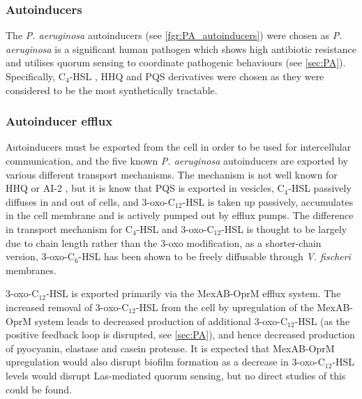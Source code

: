 

\subsubsection{Autoinducers}

The \textit{P. aeruginosa} autoinducers (see \ref{fgr:PA_autoinducers}) were chosen as \textit{P. aeruginosa} is a significant human pathogen which shows high antibiotic resistance and utilises quorum sensing to coordinate pathogenic behaviours (see \ref{sec:PA}). 
Specifically, C$_4$-HSL , HHQ  and PQS  derivatives were chosen as they were considered to be the most synthetically tractable.

\subsubsection{Autoinducer efflux\label{sec:AI_eff}}

Autoinducers must be exported from the cell in order to be used for intercellular communication, and the five known \textit{P. aeruginosa} autoinducers are exported by various different transport mechanisms.
The mechanism is not well known for HHQ  or AI-2 , but it is know that
PQS  is exported in vesicles\cite{Florez2017},
C$_4$-HSL  passively diffuses in and out of cells\cite{Pearson1999}, and
3-oxo-C$_{12}$-HSL  is taken up passively, accumulates in the cell membrane and is actively pumped out by efflux pumps.
The difference in transport mechanism for C$_4$-HSL  and 3-oxo-C$_{12}$-HSL  is thought to be largely due to chain length rather than the 3-oxo modification, as a shorter-chain version, 3-oxo-C$_6$-HSL  has been shown to be freely diffusable through \textit{V. fischeri} membranes\cite{Kaplan1985}.

3-oxo-C$_{12}$-HSL  is exported primarily via the MexAB-OprM efflux system\cite{Evans1998,Poole2004}.
The increased removal of 3-oxo-C$_{12}$-HSL  from the cell by upregulation of the MexAB-OprM system leads to decreased production of additional 3-oxo-C$_{12}$-HSL  (as the positive feedback loop is disrupted, see \ref{sec:PA}), and hence decreased production of pyocyanin, elastase and casein protease. 
It is expected that MexAB-OprM upregulation would also disrupt biofilm formation as a decrease in 3-oxo-C$_{12}$-HSL  levels would disrupt Las-mediated quorum sensing\cite{Davies1998}, but no direct studies of this could be found.

